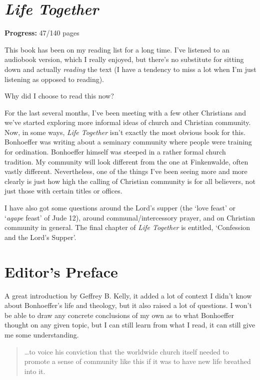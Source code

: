 \section{%
    \textit{Life Together}
    \autocite{bonhoeffer:1996}
}

\textbf{Progress:} 47/140 pages

This book has been on my reading list for a long time. I've listened to an
audiobook version, which I really enjoyed, but there's no substitute for sitting
down and actually \emph{reading} the text (I have a tendency to miss a lot when
I'm just listening as opposed to reading).

Why did I choose to read this now?

For the last several months, I’ve been meeting with a few other Christians and
we’ve started exploring more informal ideas of church and Christian community.
Now, in some ways, \textit{Life Together} isn’t exactly the most obvious book
for this.  Bonhoeffer was writing about a seminary community where people were
training for ordination. Bonhoeffer himself was steeped in a rather formal
church tradition.  My community will look different from the one at Finkenwalde,
often vastly different. Nevertheless, one of the things I’ve been seeing more
and more clearly is just how high the calling of Christian community is for all
believers, not just those with certain titles or offices.

I have also got some questions around the Lord’s supper (the ‘love feast’ or
‘\textit{agape} feast’ of Jude 12), around communal/intercessory prayer, and on
Christian community in general. The final chapter of \textit{Life Together} is
entitled, ‘Confession and the Lord’s Supper’.

\section{Editor's Preface}

A great introduction by Geffrey B. Kelly, it added a lot of context I didn't
know about Bonhoeffer's life and theology, but it also raised a lot of
questions. I won't be able to draw any concrete conclusions of my own as to what
Bonhoeffer thought on any given topic, but I can still learn from what I read,
it can still give me some understanding.

\begin{quote}
    \dots to voice his conviction that the worldwide church itself needed to
    promote a sense of community like this if it was to have new life breathed
    into it.
\end{quote}

